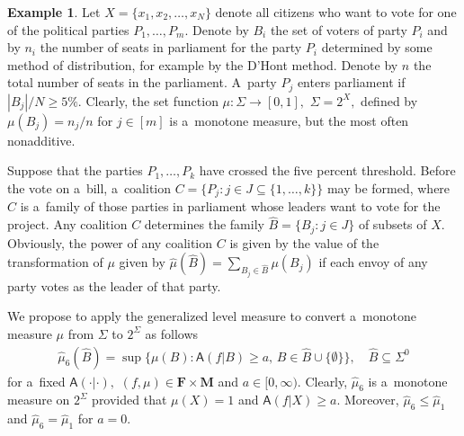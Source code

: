 \documentclass[preprint,11pt]{elsarticle}
\theoremstyle{definition}
\newtheorem{example}[tw]{Example}
\newcommand\bF{\mathbf{F}} %
\newcommand\bM{\mathbf{M}} %
\newcommand\sA{\mathsf{A}}
\renewcommand\ge{\geqslant}
\renewcommand\le{\leqslant}
\newcommand{\tx}{\textstyle{}}
\begin{document}
\begin{example}
Let $X=\{x_1,x_2,\ldots,x_N\}$ denote all citizens who want to vote for one of the political parties $P_1,\ldots,P_m.$
Denote by  $B_i$ the set of voters of party $P_i$ and by $n_i$ the number of seats in parliament
for the party $P_i$ determined by some method of distribution, for example by the D'Hont method.
Denote  by $n$ the total number of seats in the parliament. A~party $P_j$ enters parliament if $|B_j|/N\ge 5\%.$  Clearly, the set function
$\mu\colon \Sigma\to [0,1],$ $\Sigma=2^X,$ defined by $\mu(B_j)=n_j/n$ for $j\in [m]$ is a~monotone measure, but the most often nonadditive.

Suppose that the parties $P_{1},\ldots,P_{k}$ have crossed the five percent threshold. Before the vote on a~bill, a~coalition $C=\{P_j\colon j\in J \subseteq\{1,\dots,k\}\}$
may be formed, where  $C$ is a~family of those parties in parliament whose leaders want to vote for the project. Any coalition $C$ determines
the family $\widehat{B}=\{B_j\colon j\in J\}$ of subsets of $X.$ Obviously, the  power of
any coalition  $C$ is given by the value of the transformation of $\mu$ given by
$\widehat{\mu}(\widehat{B})={\tx \sum _{B_j\in \widehat{B}}\mu(B_j)}$  if each envoy of any party votes as the leader of that party.
\end{example}

We propose to apply the generalized level measure to convert a~monotone measure $\mu$ from $\Sigma$ to $2^\Sigma$ as follows
\begin{align}\label{A11}
    \widehat{\mu}_6(\widehat{B})=\sup\big\{\mu(B)\colon \sA(f|B)\ge a,\, B\in \widehat{B}\cup\{\emptyset\}\}, \quad \widehat{B}\subseteq \Sigma^0
\end{align}
for a~fixed $\sA(\cdot|\cdot),$ $(f,\mu)\in \bF\times \bM$ and $a\in [0,\infty).$
Clearly, $\widehat{\mu}_6$ is a~monotone measure on $2^{\Sigma}$ provided that $\mu(X)=1$ and $\sA(f|X)\ge a.$ Moreover, $\widehat{\mu}_6\le \widehat{\mu}_1$
and $\widehat{\mu}_6=\widehat{\mu}_1$ for $a=0.$
\end{document}
